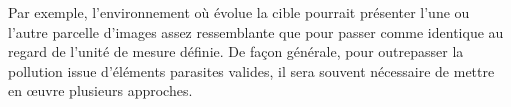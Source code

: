 \documentclass[a4paper,12pt]{report}
\begin{document}
Par exemple, l'environnement où évolue la cible pourrait présenter l'une ou l'autre parcelle d'images assez ressemblante que pour passer comme identique au regard de l'unité de mesure définie.
De façon générale, pour outrepasser la pollution issue d'éléments parasites valides, il sera souvent nécessaire de mettre en œuvre plusieurs approches.

%
\end{document}
